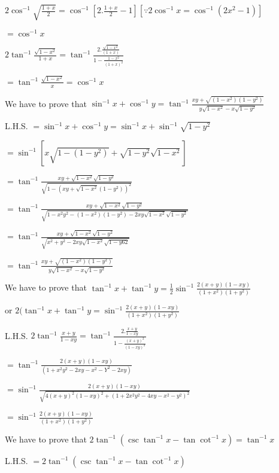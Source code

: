   $2\cos^{-1}\sqrt{\frac{1 + x}{2}} = \cos^{-1}\left[2.\frac{1 + x}{2} - 1\right][\because 2\cos^{-1}x = \cos^{-1}(2x^2 -
    1)]$

  $= \cos^{-1}x$

  $2\tan^{-1}\frac{\sqrt{1 - x^2}}{1 + x} = \tan^{-1}\frac{2.\frac{\sqrt{1 - x^2}}{(1 + x)}}{1 - \frac{1 - x^2}{(1 + x)^2}}$

  $= \tan^{-1}\frac{\sqrt{1 - x^2}}{x} = \cos^{-1}x$

\item We have to prove that $\sin^{-1}x + \cos^{-1}y = \tan^{-1}\frac{xy + \sqrt{(1 - x^2)(1 - y^2)}}{y\sqrt{1 - x^2} -
  x\sqrt{1 - y^2}}$

  L.H.S. $= \sin^{-1}x + \cos^{-1}y = \sin^{-1}x + \sin^{-1}\sqrt{1 - y^2}$

  $= \sin^{-1}[x\sqrt{1 -(1 - y^2)} + \sqrt{1 - y^2}\sqrt{1 - x^2}]$

  $=\tan^{-1}\frac{xy + \sqrt{1 - x^2}\sqrt{1 - y^2}}{\sqrt{1 - (xy + \sqrt{1 - x^2}(1 - y^2))^2}}$

  $=\tan^{-1}\frac{xy + \sqrt{1 - x^2}\sqrt{1 - y^2}}{\sqrt{1 - x^2y^2 - (1 - x^2)(1 - y^2) - 2xy\sqrt{1 - x^2}\sqrt{1 -
        y^2}}}$

  $= \tan^{-1}\frac{xy + \sqrt{1 - x^2}\sqrt{1 - y^2}}{\sqrt{x^2 + y^2 - 2xy\sqrt{1 - x^2}\sqrt{1 - y62}}}$

  $= \tan^{-1}\frac{xy + \sqrt{(1 - x^2)(1 - y^2)}}{y\sqrt{1 - x^2} - x\sqrt{1 - y^2}}$

\item We have to prove that $\tan^{-1}x + \tan^{-1}y = \frac{1}{2}\sin^{-1}\frac{2(x + y)(1 - xy)}{(1 + x^2)(1 + y^2)}$

  or $2(\tan^{-1}x + \tan^{-1}y = \sin^{-1}\frac{2(x + y)(1 - xy)}{(1 + x^2)(1 + y^2)}$

  L.H.S. $2\tan^{-1}\frac{x + y}{1 - xy} = \tan^{-1}\frac{2.\frac{x + y}{1 - xy}}{1 - \frac{(x + y)^2}{(1 - xy)^2}}$

  $= \tan^{-1}\frac{2(x + y)(1 - xy)}{(1 + x^2y^2 - 2xy - x^2 - Y^2 - 2xy)}$

  $= \sin^{-1}\frac{2(x + y)(1 - xy)}{\sqrt{4(x + y)^2(1 - xy)^2  + (1 + 2x^2y^2 - 4xy - x^2 - y^2)^2}}$

  $= \sin^{-1}\frac{2(x + y)(1 - xy)}{(1 + x^2)(1 + y^2)}$

\item We have to prove that $2\tan^{-1}(\csc\tan^{-1}x - \tan\cot^{-1}x) = \tan^{-1}x$

  L.H.S. $= 2\tan^{-1}(\csc\tan^{-1}x - \tan\cot^{-1}x)$

